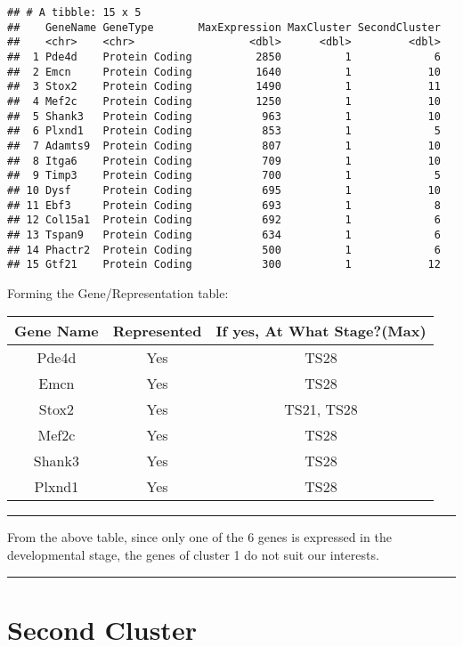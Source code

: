 \documentclass[
]{book}
\begin{document}
\begin{verbatim}
## # A tibble: 15 x 5
##    GeneName GeneType       MaxExpression MaxCluster SecondCluster
##    <chr>    <chr>                  <dbl>      <dbl>         <dbl>
##  1 Pde4d    Protein Coding          2850          1             6
##  2 Emcn     Protein Coding          1640          1            10
##  3 Stox2    Protein Coding          1490          1            11
##  4 Mef2c    Protein Coding          1250          1            10
##  5 Shank3   Protein Coding           963          1            10
##  6 Plxnd1   Protein Coding           853          1             5
##  7 Adamts9  Protein Coding           807          1            10
##  8 Itga6    Protein Coding           709          1            10
##  9 Timp3    Protein Coding           700          1             5
## 10 Dysf     Protein Coding           695          1            10
## 11 Ebf3     Protein Coding           693          1             8
## 12 Col15a1  Protein Coding           692          1             6
## 13 Tspan9   Protein Coding           634          1             6
## 14 Phactr2  Protein Coding           500          1             6
## 15 Gtf21    Protein Coding           300          1            12
\end{verbatim}

Forming the Gene/Representation table:

\begin{longtable}[]{@{}ccc@{}}
\toprule
Gene Name & Represented & If yes, At What Stage?(Max)\tabularnewline
\midrule
\endhead
Pde4d & Yes & TS28\tabularnewline
Emcn & Yes & TS28\tabularnewline
Stox2 & Yes & TS21, TS28\tabularnewline
Mef2c & Yes & TS28\tabularnewline
Shank3 & Yes & TS28\tabularnewline
Plxnd1 & Yes & TS28\tabularnewline
\bottomrule
\end{longtable}

\begin{center}\rule{0.5\linewidth}{0.5pt}\end{center}

From the above table, since only one of the 6 genes is expressed in the developmental stage, the genes of cluster 1 do not suit our interests.

\begin{center}\rule{0.5\linewidth}{0.5pt}\end{center}

\hypertarget{second-cluster}{%
\chapter{Second Cluster}\label{second-cluster}}
\end{document}
